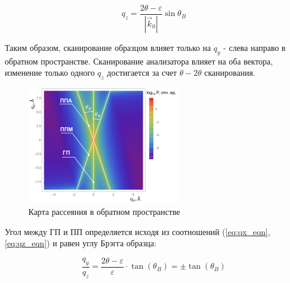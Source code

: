 \begin{equation}
  q_z = \frac{2\theta - \varepsilon}{|\vec{k}_0|} \sin \theta_B
  \label{eq:qz_eqn}
\end{equation}

Таким образом, сканирование образцом влияет только на $q_y$ - слева направо в обратном пространстве.
Сканирование анализатора влияет на оба вектора, изменение только одного $q_z$ достигается за
счет $\theta-2\theta$ сканирования.

\begin{figure}[H]
  \centering
  \includegraphics[width=0.6\textwidth]{images/triple_map_reciprocal_space.png}
  \caption{Карта рассеяния в обратном пространстве}
  \label{ris:triple_map_reciprocal_space}
\end{figure}

Угол между ГП и ПП определяется исходя из соотношений (\ref{eq:qx_eqn}, \ref{eq:qz_eqn}) и равен углу Брэгга образца:

\begin{equation}
  \frac{q_y}{q_z} = \frac{2\theta - \varepsilon}{\varepsilon} \cdot \tan (\theta_B) = \pm \tan (\theta_B)
  \label{eq:qz_eqn}
\end{equation}
